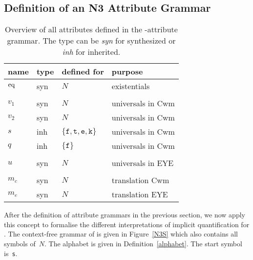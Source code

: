 \subsection{Definition of an N3 Attribute Grammar}
\begin{table}
\begin{tabular}{llll}
\hline
name & type %
& defined for &purpose \\
 \hline
 $\text{eq}$ & syn  & $ N$& existentials\\
 \\
 $v_1$ & syn &$ N$& universals in Cwm \\
 $v_2$ & syn &$ N$ & universals in Cwm\\
 $s$ & inh &$\{\texttt{f}, \texttt{t},\texttt{e}, \texttt{k}\}$& universals in Cwm \\
  $q$ & inh &$\{\texttt{f}\}$& universals in Cwm \\
  \\
  $u$ & syn &$ N$& universals in EYE \\
  \\
  $m_c$ & syn  &$ N$& translation Cwm\\
  $m_e$ &syn &$ N$& translation EYE \\
  \hline
\end{tabular}
\caption{Overview of all attributes defined in the \nthree-attribute grammar. The type can be \emph{syn} for synthesized or \emph{inh} for inherited. \label{attributes}}
\end{table}

After the definition of attribute grammars in the previous section, 
we now apply this concept to 
formalise the different interpretations of implicit quantification for \nthreelogic. 
The context-free grammar of \nthree is given in Figure~\ref{N3S} which also contains all symbols of~$N$. The alphabet is given in Definition~\ref{alphabet}. 
The start symbol is~\texttt{s}.

